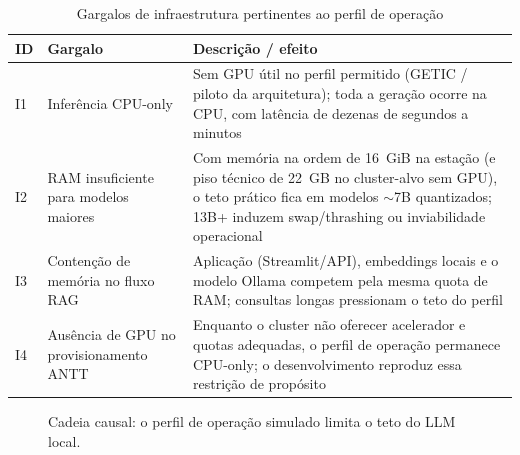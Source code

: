 \documentclass[12pt, a4paper]{article}
\begin{document}
\begin{table}[H]
\centering
\small
\caption{Gargalos de infraestrutura pertinentes ao perfil de operação}
\label{tab:gargalos_infra}
\begin{tabularx}{\textwidth}{
  >{\centering\arraybackslash}p{0.8cm}
  >{\raggedright\arraybackslash}p{3.8cm}
  >{\raggedright\arraybackslash}X
}
\toprule
\textbf{ID} & \textbf{Gargalo} & \textbf{Descrição / efeito} \\
\midrule
I1 & Inferência CPU-only & Sem GPU útil no perfil permitido (GETIC / piloto da arquitetura); toda a geração ocorre na CPU, com latência de dezenas de segundos a minutos \\
I2 & RAM insuficiente para modelos maiores & Com memória na ordem de 16~GiB na estação (e piso técnico de 22~GB no cluster-alvo sem GPU), o teto prático fica em modelos $\sim$7B quantizados; 13B+ induzem swap/thrashing ou inviabilidade operacional \\
I3 & Contenção de memória no fluxo RAG & Aplicação (Streamlit/API), embeddings locais e o modelo Ollama competem pela mesma quota de RAM; consultas longas pressionam o teto do perfil \\
I4 & Ausência de GPU no provisionamento ANTT & Enquanto o cluster não oferecer acelerador e quotas adequadas, o perfil de operação permanece CPU-only; o desenvolvimento reproduz essa restrição de propósito \\
\bottomrule
\end{tabularx}
\end{table}

\begin{figure}[H]
\centering
\footnotesize
{}
\caption{Cadeia causal: o perfil de operação simulado limita o teto do LLM local.}
\label{fig:cadeia_infra}
\end{figure}
\end{document}
